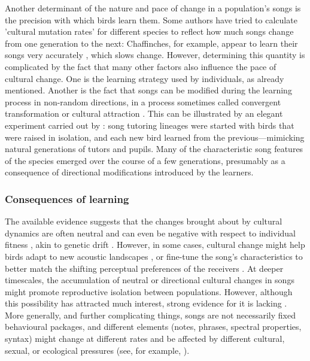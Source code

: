 Another determinant of the nature and pace of change in a population's songs is the precision with which birds learn them. Some authors have tried to calculate 'cultural mutation rates' for different species to reflect how much songs change from one generation to the next: Chaffinches, for example, appear to learn their songs very accurately \autocite{lachlan2003a,Slater1986}, which slows change. However, determining this quantity is complicated by the fact that many other factors also influence the pace of cultural change. One is the learning strategy used by individuals, as already mentioned. Another is the fact that songs can be modified during the learning process in non-random directions, in a process sometimes called convergent transformation or cultural attraction \autocite{claidiere2018,gray2007,heyes1993,morin2016}. This can be illustrated by an elegant experiment carried out by \textcite{feher2009}: song tutoring lineages were started with birds that were raised in isolation, and each new bird learned from the previous---mimicking natural generations of tutors and pupils. Many of the characteristic song features of the species emerged over the course of a few generations, presumably as a consequence of directional modifications introduced by the learners.

\subsubsection{Consequences of learning}
The available evidence suggests that the changes brought about by cultural dynamics are often neutral and can even be negative with respect to individual fitness \autocite{langin2017,slater2003}, akin to genetic drift \autocite{Grant2010}. However, in some cases, cultural change might help birds adapt to new acoustic landscapes \autocite{rios-chelen2012,slater2003}, or fine-tune the song's characteristics to better match the shifting perceptual preferences of the receivers \autocite{Renoult2019b}. At deeper timescales, the accumulation of neutral or directional cultural changes in songs might promote reproductive isolation between populations. However, although this possibility has attracted much interest, strong evidence for it is lacking \autocite{freeman2022,Lachlan2004,verzijden2012,Yeh2015}. More generally, and further complicating things, songs are not necessarily fixed behavioural packages, and different elements (notes, phrases, spectral properties, syntax) might change at different rates and be affected by different cultural, sexual, or ecological pressures (see, for example, \cite{williams2013}).

